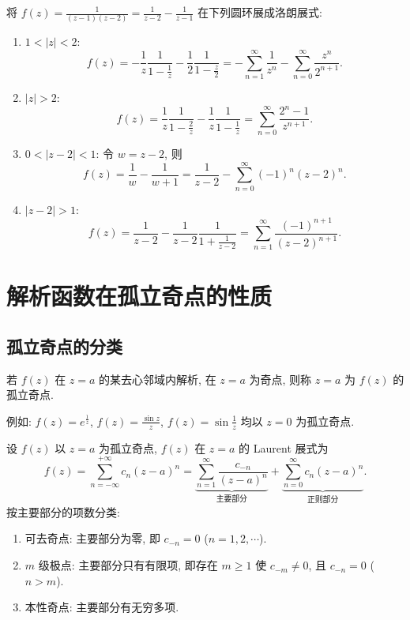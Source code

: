 \documentclass[theorem=false,mathfont=none,openany,sub3section]{easybook}
\begin{document}
\begin{example}
  将 $f(z)=\frac{1}{(z-1)(z-2)}=\frac{1}{z-2}-\frac{1}{z-1}$ 在下列圆环展成洛朗展式:
  \begin{enumerate}
    \item $1<|z|<2$:
    \[
    f(z)=-\frac{1}{z}\frac{1}{1-\frac{1}{z}}-\frac{1}{2}\frac{1}{1-\frac{z}{2}}
    =-\sum_{n=1}^{\infty}\frac{1}{z^{n}}-\sum_{n=0}^{\infty}\frac{z^{n}}{2^{n+1}}.
    \]
    \item $|z|>2$:
    \[
    f(z)=\frac{1}{z}\frac{1}{1-\frac{2}{z}}-\frac{1}{z}\frac{1}{1-\frac{1}{z}}
    =\sum_{n=0}^{\infty}\frac{2^{n}-1}{z^{n+1}}.
    \]
    \item $0<|z-2|<1$: 令 $w=z-2$, 则
    \[
    f(z)=\frac{1}{w}-\frac{1}{w+1}
    =\frac{1}{z-2}-\sum_{n=0}^{\infty}(-1)^{n}(z-2)^{n}.
    \]
    \item $|z-2|>1$:
    \[
    f(z)=\frac{1}{z-2}-\frac{1}{z-2}\frac{1}{1+\frac{1}{z-2}}
    =\sum_{n=1}^{\infty}\frac{(-1)^{n+1}}{(z-2)^{n+1}}.
    \]
  \end{enumerate}
\end{example}

\newpage

\section{解析函数在孤立奇点的性质}

\subsection{孤立奇点的分类}

\begin{definition}
  若 $f(z)$ 在 $z=a$ 的某去心邻域内解析, 在 $z=a$ 为奇点, 则称 $z=a$ 为 $f(z)$ 的孤立奇点.
\end{definition}

例如: $f(z)=e^{\frac{1}{z}}$, $f(z)=\frac{\sin z}{z}$, $f(z)=\sin\frac{1}{z}$ 均以 $z=0$ 为孤立奇点.

设 $f(z)$ 以 $z=a$ 为孤立奇点, $f(z)$ 在 $z=a$ 的 Laurent 展式为
\[
f(z)=\sum_{n=-\infty}^{+\infty}c_{n}(z-a)^{n}
=\underbrace{\sum_{n=1}^{\infty}\frac{c_{-n}}{(z-a)^{n}}}_{\text{主要部分}}+\underbrace{\sum_{n=0}^{\infty}c_{n}(z-a)^{n}}_{\text{正则部分}}.
\]
按主要部分的项数分类:
\begin{enumerate}
  \item 可去奇点: 主要部分为零, 即 $c_{-n}=0$ ($n=1,2,\cdots$).
  \item $m$ 级极点: 主要部分只有有限项, 即存在 $m\geq1$ 使 $c_{-m}\neq0$, 且 $c_{-n}=0$ ($n>m$).
  \item 本性奇点: 主要部分有无穷多项.
\end{enumerate}
\end{document}

